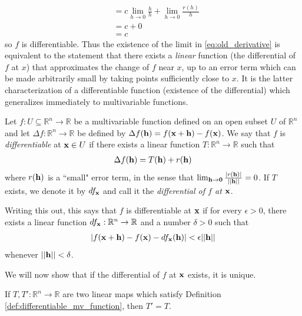 \documentclass[12pt,letterpaper,reqno]{article}
\numberwithin{equation}{section}
\newcommand{\bh}{{\bf h}}
\newcommand{\R}{\ensuremath{\mathbb R}}
\newcommand{\zv}{{\bf 0}}
\newcommand{\bx}{{\bf x}}
\begin{document}
{\begin{align*}
	&=c\lim_{h \to 0}\frac{h}{h}+\lim_{h \to 0}\frac{r(h)}{h} \\
	&=c+0 \\
	&=c
\end{align*} 
so $f$ is differentiable. Thus the existence of the limit in \eqref{eq:old_derivative} is equivalent to the statement that there exists a \emph{linear} function (the differential of $f$ at $x$) that approximates the change of $f$ near $x$, up to an error term which can be made arbitrarily small by taking points sufficiently close to $x$. It is the latter characterization of a differentiable function (existence of the differential) which generalizes immediately to multivariable functions.

\begin{defn}\label{def:differentiable_mv_function}
Let $f:U \subseteq \R^n \to \R$ be a multivariable function defined on an open subset $U$ of $\R^n$ and let $\Delta f:\R^n \to \R$ be defined by $\Delta f(\bh)=f(\bx + \bh)-f(\bx)$. We say that $f$ is \emph{differentiable} at $\bx \in U$ if there exists a linear function $T:\R^n \to \R$ such that  
\begin{align*}
	\Delta f(\bh)=T(\bh)+r(\bh)
\end{align*}	
where $r(\bh)$ is a ``small" error term, in the sense that $\lim_{\bh \to \zv}\frac{|r(\bh)|}{||\bh||}=0$. If $T$ exists, we denote it by $df_\bx$ and call it the \emph{differential of $f$ at $\bx$}. 

Writing this out, this says that $f$ is differentiable at $\bx$ if for every $\epsilon>0$, there exists a linear function $df_\bx:\R^n \to \R$ and a number $\delta>0$ such that 
\begin{align*}
	|f(\bx+\bh)-f(\bx)-df_\bx(\bh)|<\epsilon ||\bh||
\end{align*}
whenever $||\bh||<\delta$.
\end{defn}
We will now show that if the differential of $f$ at $\bx$ exists, it is unique.

\begin{prop}\label{prop:uniqueness_of_the_differential}
	If $T,T':\R^n \to \R$ are two linear maps which satisfy Definition \ref{def:differentiable_mv_function}, then $T'=T$.
\end{prop}

}
\end{document}
